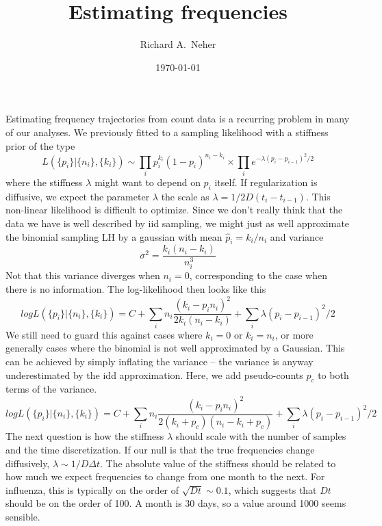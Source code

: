 \documentclass[aps,rmp, onecolumn]{revtex4}
\begin{document}
\title{Estimating frequencies}
\author{Richard A.~Neher}
\date{\today}
\maketitle

Estimating frequency trajectories from count data is a recurring problem in many of our analyses.
We previously fitted to a sampling likelihood with a stiffness prior of the type
\begin{equation}
    L(\{p_i\} | \{n_i\}, \{k_i\}) \sim \prod_i p_i^{k_i} (1-p_i)^{n_i-k_i} \times \prod_i e^{ - \lambda (p_i - p_{i-1})^2/2}
\end{equation}
where the stiffness $\lambda$ might want to depend on $p_i$ itself.
If regularization is diffusive, we expect the parameter $\lambda$ the scale as $\lambda = 1/2D(t_i-t_{i-1})$.
This non-linear likelihood is difficult to optimize.
Since we don't really think that the data we have is well described by iid sampling, we might just as well approximate the binomial sampling LH by a gaussian with mean $\hat{p}_i = k_i/n_i$ and variance
\begin{equation}
    \sigma^2 = \frac{k_i(n_i-k_i)}{n_i^3}
\end{equation}
Not that this variance diverges when $n_i=0$, corresponding to the case when there is no information.
The log-likelihood then looks like this
\begin{equation}
    logL(\{p_i\} | \{n_i\}, \{k_i\}) = C + \sum_i n_i\frac{(k_i - p_i n_i)^2}{2k_i(n_i-k_i)}  + \sum_i \lambda (p_i - p_{i-1})^2/2
\end{equation}
We still need to guard this against cases where $k_i=0$ or $k_i=n_i$, or more generally cases where the binomial is not well approximated by a Gaussian. This can be achieved by simply inflating the variance -- the variance is anyway underestimated by the idd approximation.
Here, we add pseudo-counts $p_c$ to both terms of the variance.
\begin{equation}
    logL(\{p_i\} | \{n_i\}, \{k_i\}) = C + \sum_i n_i\frac{(k_i - p_i n_i)^2}{2(k_i+p_c)(n_i-k_i+p_c)}  + \sum_i \lambda (p_i - p_{i-1})^2/2
\end{equation}
The next question is how the stiffness $\lambda$ should scale with the number of samples and the time discretization.
If our null is that the true frequencies change diffusively, $\lambda \sim 1/D\Delta t$.
The absolute value of the stiffness should be related to how much we expect frequencies to change from one month to the next.
For influenza, this is typically on the order of $\sqrt{Dt} \sim 0.1$, which suggests that $Dt$ should be on the order of 100.
A month is 30 days, so a value around 1000 seems sensible.
\end{document}
